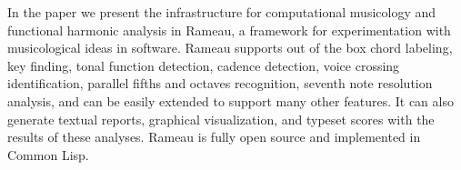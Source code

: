 In the paper we present the infrastructure for computational
musicology and functional harmonic analysis in Rameau, a framework for
experimentation with musicological ideas in software. Rameau supports
out of the box chord labeling, key finding, tonal function detection,
cadence detection, voice crossing identification, parallel fifths and
octaves recognition, seventh note resolution analysis, and can be
easily extended to support many other features. It can also generate
textual reports, graphical visualization, and typeset scores with the
results of these analyses. Rameau is fully open source and implemented
in Common Lisp.

